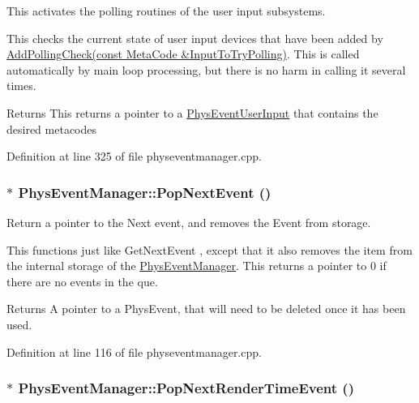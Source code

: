 This activates the polling routines of the user input subsystems. 

This checks the current state of user input devices that have been added by \hyperlink{classPhysEventManager_a1e99385441c5377a741561db581ef3ae}{AddPollingCheck(const MetaCode \&InputToTryPolling)}. This is called automatically by main loop processing, but there is no harm in calling it several times. \begin{DoxyReturn}{Returns}
This returns a pointer to a \hyperlink{classPhysEventUserInput}{PhysEventUserInput} that contains the desired metacodes 
\end{DoxyReturn}


Definition at line 325 of file physeventmanager.cpp.

\hypertarget{classPhysEventManager_a23091695829acad90c499f6724fe048c}{
\subsubsection[{PopNextEvent}]{ $\ast$ PhysEventManager::PopNextEvent ()}}
\label{d5/dd7/classPhysEventManager_a23091695829acad90c499f6724fe048c}


Return a pointer to the Next event, and removes the Event from storage. 

This functions just like GetNextEvent , except that it also removes the item from the internal storage of the \hyperlink{classPhysEventManager}{PhysEventManager}. This returns a pointer to 0 if there are no events in the que. \begin{DoxyReturn}{Returns}
A pointer to a PhysEvent, that will need to be deleted once it has been used. 
\end{DoxyReturn}


Definition at line 116 of file physeventmanager.cpp.

\hypertarget{classPhysEventManager_ad627925363fdbcff98e0faef204e81e2}{
\subsubsection[{PopNextRenderTimeEvent}]{ $\ast$ PhysEventManager::PopNextRenderTimeEvent ()}}
\label{d5/dd7/classPhysEventManager_ad627925363fdbcff98e0faef204e81e2}


